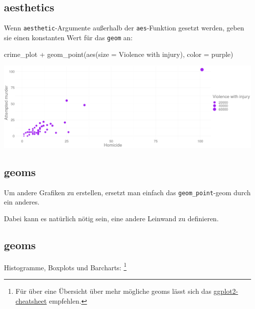 \documentclass[
]{book}
\newenvironment{Shaded}{\begin{snugshade}}{\end{snugshade}}
\newcommand{\AttributeTok}[1]{\textcolor[rgb]{0.77,0.63,0.00}{#1}}
\newcommand{\FunctionTok}[1]{\textcolor[rgb]{0.00,0.00,0.00}{#1}}
\newcommand{\NormalTok}[1]{#1}
\newcommand{\SpecialCharTok}[1]{\textcolor[rgb]{0.00,0.00,0.00}{#1}}
\newcommand{\StringTok}[1]{\textcolor[rgb]{0.31,0.60,0.02}{#1}}
\begin{document}
\hypertarget{aesthetics-3}{%
\subsection{aesthetics}\label{aesthetics-3}}

Wenn \texttt{aesthetic}-Argumente außerhalb der \texttt{aes}-Funktion gesetzt werden, geben sie einen konstanten Wert für das \texttt{geom} an:

\begin{Shaded}
\begin{Highlighting}[]
\NormalTok{crime\_plot }\SpecialCharTok{+} \FunctionTok{geom\_point}\NormalTok{(}\FunctionTok{aes}\NormalTok{(}\AttributeTok{size =} \StringTok{\textasciigrave{}}\AttributeTok{Violence with injury}\StringTok{\textasciigrave{}}\NormalTok{), }
                            \AttributeTok{color =} \StringTok{\textquotesingle{}purple\textquotesingle{}}\NormalTok{)}
\end{Highlighting}
\end{Shaded}

\begin{center}\includegraphics[width=24in]{imgs/pts3} \end{center}

\hypertarget{geoms}{%
\subsection{geoms}\label{geoms}}

Um andere Grafiken zu erstellen, ersetzt man einfach das \texttt{geom\_point}-geom durch ein anderes.

Dabei kann es natürlich nötig sein, eine andere Leinwand zu definieren.

\hypertarget{geoms-1}{%
\subsection{geoms}\label{geoms-1}}

Histogramme, Boxplots und Barcharts: \footnote{Für über eine Übersicht über mehr mögliche geoms lässt sich das \href{https://raw.githubusercontent.com/rstudio/cheatsheets/master/data-visualization-2.1.pdf}{ggplot2-cheatsheet} empfehlen.}
\end{document}
